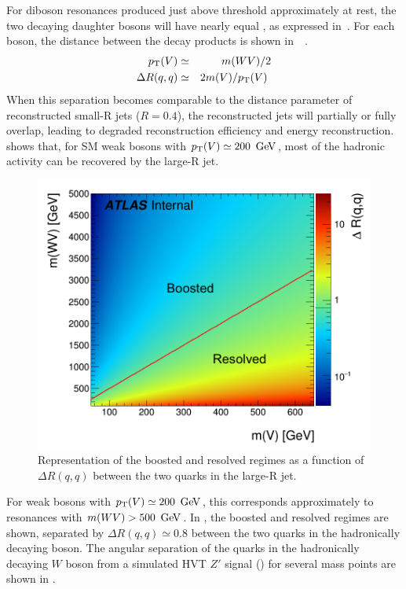 For diboson resonances produced just above threshold approximately at rest, the two decaying daughter bosons will have nearly equal \pT, as expressed in~\Eqn{\ref{eq:pt_larger}}. For each boson, the distance between the decay products is shown in~\Eqn{\ref{eq:dr_larger}}~\cite{LargeRjet_kin}. 
\begin{eqnarray}
\pt(V)&\simeq& m(WV)/2 \label{eq:pt_larger} \\
\Delta R(q,q)&\simeq&2m(V)/\pt(V) \label{eq:dr_larger}
\end{eqnarray}
When this separation becomes comparable to the distance parameter of reconstructed small-R jets ($R=0.4$), the reconstructed jets will partially or fully overlap, leading to degraded reconstruction efficiency and energy reconstruction. \Eqn{\ref{eq:dr_larger}} shows that, for SM weak bosons with $\pT(V)\simeq 200\,\GeV$, most of the hadronic activity can be recovered by the large-R jet. 
\begin{figure}
	\begin{center}
		\includegraphics[width=.6\textwidth]{figures/AnalysisStrategy/h_boosted_resolved_2}
		\caption[Boosted and resolved regimes]{Representation of the boosted and resolved regimes as a function of $\Delta R(q,q)$ between the two quarks in the large-R jet.}
		\label{fig:boosted_regime}
	\end{center}
\end{figure}
For weak bosons with $\pT(V)\simeq 200\,\GeV$, this corresponds approximately to resonances with $m(WV)>500\,\GeV$. In \Fig{\ref{fig:boosted_regime}}, the boosted and resolved regimes are shown, separated by $\Delta R(q,q)\simeq 0.8$ between the two quarks in the hadronically decaying boson.  The angular separation of the quarks in the hadronically decaying $W$ boson from a simulated HVT $Z'$ signal (\Sect{\ref{ch:analysisStrategy:sig_bkg_model}}) for several mass points are shown in \Fig{\ref{fig:dr_qq}}. 


